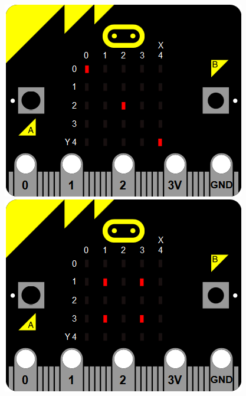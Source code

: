 \documentclass[11pt]{article}
\begin{document}
\begin{figure}[!h]
\begin{center}
\includegraphics[scale=0.3]{die3.png}\includegraphics[scale=0.3]{die4.png}\\

\end{center}
\end{figure}
\end{document}
